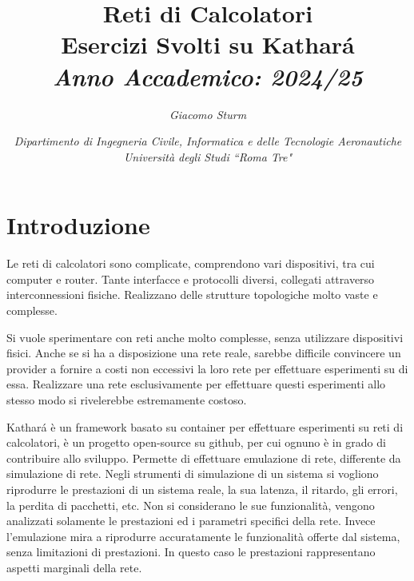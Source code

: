 \documentclass{article}
\numberwithin{equation}{subsection}
\begin{document}
\title{%
    \textbf{Reti di Calcolatori}  \\ 
    \large Esercizi Svolti su Kathará \\
    \textit{Anno Accademico: 2024/25}}
\author{\textit{Giacomo Sturm}}
\date{\textit{Dipartimento di Ingegneria Civile, Informatica e delle Tecnologie Aeronautiche \\
Università degli Studi ``Roma Tre"}}

\maketitle
\thispagestyle{link}

\clearpage


\pagestyle{fancy}
\fancyhead{}\fancyfoot{}
\fancyfoot[C]{\thepage}

\tableofcontents

\clearpage
{}



\section{Introduzione}

Le reti di calcolatori sono complicate, comprendono vari dispositivi, tra cui computer e router. Tante interfacce e protocolli diversi, collegati attraverso interconnessioni fisiche. Realizzano delle strutture 
topologiche molto vaste e complesse. 


Si vuole sperimentare con reti anche molto complesse, senza utilizzare dispositivi fisici. 
Anche se si ha a disposizione una rete reale, sarebbe difficile convincere un provider a fornire a costi non eccessivi la loro rete per effettuare esperimenti su di essa. Realizzare una rete esclusivamente 
per effettuare questi esperimenti allo stesso modo si rivelerebbe estremamente costoso. 


Kathar\'{a} è un framework basato su container per effettuare esperimenti su reti di calcolatori, è un progetto open-source su github, per cui ognuno è in grado di contribuire allo sviluppo. 
Permette di effettuare emulazione di rete, differente da simulazione di rete. Negli strumenti di simulazione di un sistema si vogliono riprodurre le prestazioni di un sistema reale, la sua latenza, il ritardo, gli 
errori, la perdita di pacchetti, etc. Non si considerano le sue funzionalità, vengono analizzati solamente le prestazioni ed i parametri specifici della rete. 
Invece l'emulazione mira a riprodurre accuratamente le funzionalità offerte dal sistema, senza limitazioni di prestazioni. In questo caso le prestazioni rappresentano aspetti marginali della rete. 
\end{document}
